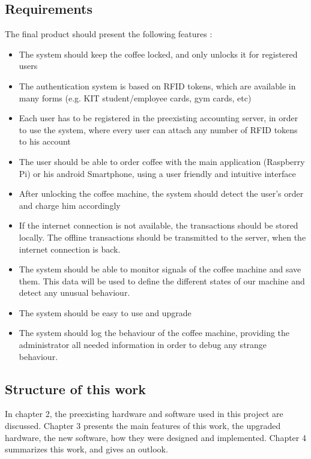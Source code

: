\documentclass[12pt]{article}
\begin{document}
  \subsection{Requirements}
  The final product should present the following features : \\
  \begin{itemize}
  \item The system should keep the coffee locked, and only unlocks it for registered users

  \item The authentication system is based on RFID tokens, which are available in many forms (e.g. KIT student/employee cards, gym cards, etc)
 
  \item Each user has to be registered in the preexisting accounting server, in order to use the system, where every user can attach any number of RFID tokens to his account

  \item The user should be able to order coffee with the main application (Raspberry Pi) or his android Smartphone, using a user friendly and intuitive interface

  \item After unlocking the coffee machine, the system should detect the user's order and charge him accordingly
  
  \item If the internet connection is not available, the transactions should be stored locally. 
  The offline transactions should be transmitted to the server, when the internet connection is back.
  
  \item The system should be able to monitor signals of the coffee machine and save them. This data will be used to define the different states of our machine and detect any unusual behaviour.
  \item The system should be easy to use and upgrade
  \item The system should log the behaviour of the coffee machine, providing the administrator all needed information in order to debug any strange behaviour.
   \end{itemize}
   \pagebreak
   \subsection{Structure of this work}
   
   In chapter 2, the preexisting hardware and software used in this project are discussed.
   Chapter 3 presents the main features of this work, the upgraded hardware, the new software, how they were designed and implemented.
   Chapter 4 summarizes this work, and gives an outlook.
\end{document}
